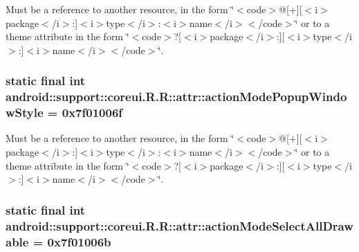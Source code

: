 Must be a reference to another resource, in the form \char`\"{}$<$code$>$@\mbox{[}+\mbox{]}\mbox{[}$<$i$>$package$<$/i$>$:\mbox{]}$<$i$>$type$<$/i$>$:$<$i$>$name$<$/i$>$$<$/code$>$\char`\"{} or to a theme attribute in the form \char`\"{}$<$code$>$?\mbox{[}$<$i$>$package$<$/i$>$:\mbox{]}\mbox{[}$<$i$>$type$<$/i$>$:\mbox{]}$<$i$>$name$<$/i$>$$<$/code$>$\char`\"{}. \hypertarget{classandroid_1_1support_1_1coreui_1_1_r_1_1attr_6a41f1e6aa67dfbb21d16ed990bea9ba}{
\subsubsection[{actionModePopupWindowStyle}]{\setlength{\rightskip}{0pt plus 5cm}static final int android::support::coreui.R.R::attr::actionModePopupWindowStyle = 0x7f01006f}}
\label{classandroid_1_1support_1_1coreui_1_1_r_1_1attr_6a41f1e6aa67dfbb21d16ed990bea9ba}


Must be a reference to another resource, in the form \char`\"{}$<$code$>$@\mbox{[}+\mbox{]}\mbox{[}$<$i$>$package$<$/i$>$:\mbox{]}$<$i$>$type$<$/i$>$:$<$i$>$name$<$/i$>$$<$/code$>$\char`\"{} or to a theme attribute in the form \char`\"{}$<$code$>$?\mbox{[}$<$i$>$package$<$/i$>$:\mbox{]}\mbox{[}$<$i$>$type$<$/i$>$:\mbox{]}$<$i$>$name$<$/i$>$$<$/code$>$\char`\"{}. \hypertarget{classandroid_1_1support_1_1coreui_1_1_r_1_1attr_12f901faf512f7ce001aa6290a0796da}{
\subsubsection[{actionModeSelectAllDrawable}]{\setlength{\rightskip}{0pt plus 5cm}static final int android::support::coreui.R.R::attr::actionModeSelectAllDrawable = 0x7f01006b}}
\label{classandroid_1_1support_1_1coreui_1_1_r_1_1attr_12f901faf512f7ce001aa6290a0796da}


